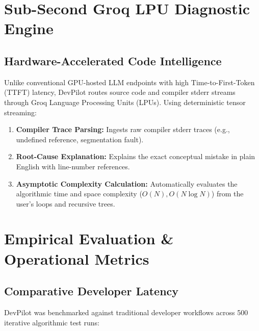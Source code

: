 \documentclass[12pt,a4paper]{report}
\begin{document}
\chapter{Sub-Second Groq LPU Diagnostic Engine}

\section{Hardware-Accelerated Code Intelligence}
Unlike conventional GPU-hosted LLM endpoints with high Time-to-First-Token (TTFT) latency, DevPilot routes source code and compiler stderr streams through Groq Language Processing Units (LPUs). Using deterministic tensor streaming:
\begin{enumerate}[nosep]
    \item \textbf{Compiler Trace Parsing:} Ingests raw compiler stderr traces (e.g., undefined reference, segmentation fault).
    \item \textbf{Root-Cause Explanation:} Explains the exact conceptual mistake in plain English with line-number references.
    \item \textbf{Asymptotic Complexity Calculation:} Automatically evaluates the algorithmic time and space complexity ($O(N), O(N \log N)$) from the user's loops and recursive trees.
\end{enumerate}

\chapter{Empirical Evaluation \& Operational Metrics}

\section{Comparative Developer Latency}
DevPilot was benchmarked against traditional developer workflows across 500 iterative algorithmic test runs:
\end{document}
